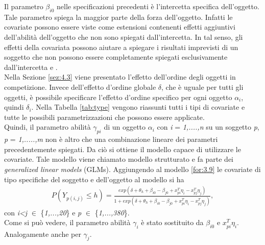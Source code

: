 Il parametro $\beta_{i0}$ nelle specificazioni precedenti è l'intercetta specifica dell'oggetto. Tale parametro spiega la maggior parte della forza dell'oggetto. Infatti le covariate possono essere viste come estensioni contenenti effetti aggiuntivi dell'abilità dell'oggetto che non sono spiegati dall'intercetta. In tal senso, gli effetti della covariata possono aiutare a spiegare i risultati imprevisti di un soggetto che non possono essere completamente spiegati esclusivamente dall'intercetta \autocite{cattelan2012models} e \autocite{schauberger2017}.\\
Nella Sezione \ref{sez:4.3} viene presentato l'effetto dell'ordine degli oggetti in competizione. Invece dell'effetto d'ordine globale $\delta$, che è uguale per tutti gli oggetti, è possibile specificare l'effetto d'ordine specifico per ogni oggetto $\alpha_i$, quindi $\delta_i$. Nella Tabella \ref{tab:type} vengono riassunti tutti i tipi di covariate e tutte le possibili parametrizzazioni che possono essere applicate.\\
Quindi, il parametro abilità $\gamma_{pi}$ di un oggetto $\alpha_i$ con \emph{i} = \emph{1,....,n} su un soggetto \emph{p}, \emph{p} = \emph{1,.....,m} non è altro che una combinazione lineare dei parametri precedentemente spiegati. Da ciò si ottiene il modello capace di utilizzare le covariate. Tale modello viene chiamato modello strutturato e fa parte dei \emph{generalized linear models} (GLMs). Aggiungendo al modello \ref{for:3.9} le covariate di tipo specifiche del soggetto e dell'oggetto al modello si ha
\begin{align}
	P(Y_{p(i,j)}\leq h) =  \frac{exp(\delta + \theta_{h} + \beta_{i0} - \beta_{j0} + x^T_{pi}\eta_i - x^T_{pj}\eta_j)}{1 + exp(\delta + \theta_{h} + \beta_{i0} - \beta_{j0} + x^T_{pi}\eta_i - x^T_{pj}\eta_j)}, \label{for:4.9}
\end{align}
con \emph{i<j} $\in$ \{\emph{1,...,20}\} e \emph{p} $\in$ \{\emph{1,...,380}\}.\\
Come si può vedere, il parametro abilità $\gamma_{i}$ è stato sostituito da $\beta_{i0}$ e $ x^T_{pi}\eta_i$. Analogamente anche per $\gamma_{j}$.

